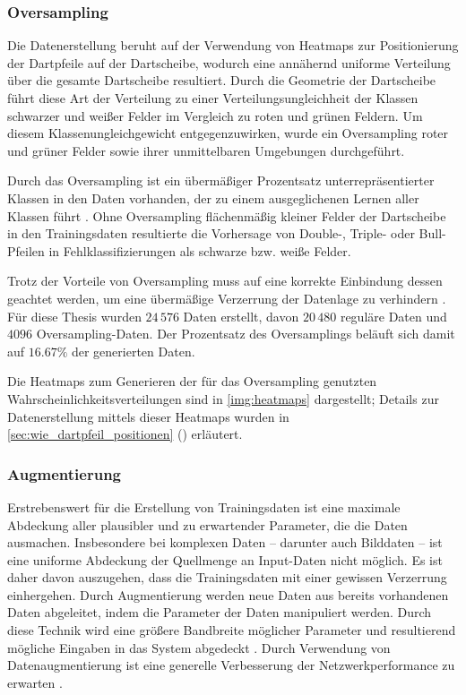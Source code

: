 \subsubsection{Oversampling}
\label{sec:oversampling}

Die Datenerstellung beruht auf der Verwendung von Heatmaps zur Positionierung der Dartpfeile auf der Dartscheibe, wodurch eine annähernd uniforme Verteilung über die gesamte Dartscheibe resultiert. Durch die Geometrie der Dartscheibe führt diese Art der Verteilung zu einer Verteilungsungleichheit der Klassen schwarzer und weißer Felder im Vergleich zu roten und grünen Feldern. Um diesem Klassenungleichgewicht entgegenzuwirken, wurde ein Oversampling roter und grüner Felder sowie ihrer unmittelbaren Umgebungen durchgeführt.

Durch das Oversampling ist ein übermäßiger Prozentsatz unterrepräsentierter Klassen in den Daten vorhanden, der zu einem ausgeglichenen Lernen aller Klassen führt \cite{oversampling}. Ohne Oversampling flächenmäßig kleiner Felder der Dartscheibe in den Trainingsdaten resultierte die Vorhersage von Double-, Triple- oder Bull-Pfeilen in Fehlklassifizierungen als schwarze bzw. weiße Felder.

Trotz der Vorteile von Oversampling muss auf eine korrekte Einbindung dessen geachtet werden, um eine übermäßige Verzerrung der Datenlage zu verhindern \cite{oversampling_bad}. Für diese Thesis wurden $24\,576$ Daten erstellt, davon $20\,480$ reguläre Daten und $4096$ Oversampling-Daten. Der Prozentsatz des Oversamplings beläuft sich damit auf $16.67\%$ der generierten Daten.

Die Heatmaps zum Generieren der für das Oversampling genutzten Wahrscheinlichkeitsverteilungen sind in \autoref{img:heatmaps} dargestellt; Details zur Datenerstellung mittels dieser Heatmaps wurden in \autoref{sec:wie_dartpfeil_positionen} () erläutert.


\subsubsection{Augmentierung}
\label{sec:daten_augmentierung}

Erstrebenswert für die Erstellung von Trainingsdaten ist eine maximale Abdeckung aller plausibler und zu erwartender Parameter, die die Daten ausmachen. Insbesondere bei komplexen Daten -- darunter auch Bilddaten -- ist eine uniforme Abdeckung der Quellmenge an Input-Daten nicht möglich. Es ist daher davon auszugehen, dass die Trainingsdaten mit einer gewissen Verzerrung einhergehen. Durch Augmentierung werden neue Daten aus bereits vorhandenen Daten abgeleitet, indem die Parameter der Daten manipuliert werden. Durch diese Technik wird eine größere Bandbreite möglicher Parameter und resultierend mögliche Eingaben in das System abgedeckt \cite{augmentierung, augmentation_max_likelihood_est}. Durch Verwendung von Datenaugmentierung ist eine generelle Verbesserung der Netzwerkperformance zu erwarten \cite{augmentierung_auswirking}.

